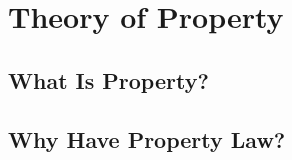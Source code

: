 \chapter{Theory of Property}




\section{What Is Property?}







\begin{questions}


\end{questions}



\section{Why Have Property Law?}





